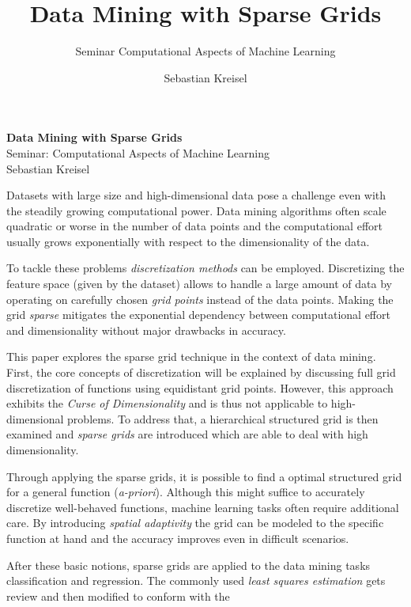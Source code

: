 \documentclass[a4paper]{scrartcl}
\title{Data Mining with Sparse Grids}
\subtitle{Seminar Computational Aspects of Machine Learning}
\author{Sebastian Kreisel}
\date{}
\begin{document}
\thispagestyle{empty}
\begin{center}
  \huge{\textbf{Data Mining with Sparse Grids}} \\
  \vspace{6px}
  \large{Seminar: Computational Aspects of Machine Learning} \\
  \vspace{15px}
  Sebastian Kreisel
\end{center}
\vspace{30px}
Datasets with large size and high-dimensional data pose a challenge even
with the steadily growing computational power.
Data mining algorithms often scale quadratic or worse in the number of
data points and the computational effort usually grows exponentially with
respect to the
dimensionality of the data.
\par
To tackle these problems \emph{discretization methods} can be employed.
Discretizing the feature space (given by the dataset)
allows to handle a large amount of data
by operating on carefully chosen \emph{grid points} instead of the data points.
Making the grid \emph{sparse} mitigates the exponential
dependency between computational effort and dimensionality without
major drawbacks in accuracy.
\par
This paper explores the sparse grid technique in the context of data mining.
First, the core concepts of discretization will be explained by
discussing full grid discretization of functions
using equidistant grid points. However,
this approach exhibits the \emph{Curse of Dimensionality} and is thus not
applicable to high-dimensional problems. To address that, a hierarchical
structured grid is then examined and
\emph{sparse grids} are introduced which are able to deal with high
dimensionality.
\par
Through applying the sparse grids,
it is possible to find a optimal structured
grid for a general function (\emph{a-priori}). Although this might suffice to
accurately discretize well-behaved functions, machine learning
tasks often require additional care. By introducing \emph{spatial adaptivity}
the grid can be modeled to the specific function at hand and the accuracy
improves even in difficult scenarios.
\par
After these basic notions, sparse grids are
applied to the data mining tasks classification and regression.
The commonly used \emph{least squares
estimation} gets review and then modified to conform with the
\end{document}

